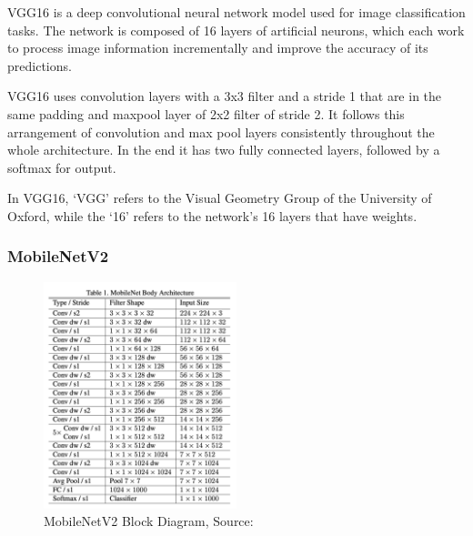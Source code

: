         VGG16 is a deep convolutional neural network model used for image classification tasks. The network is composed of 16 layers of artificial neurons, which each work to process image information incrementally and improve the accuracy of its predictions.\par \vspace{1em}

        VGG16 uses convolution layers with a 3x3 filter and a stride 1 that are in the same padding and maxpool layer of 2x2 filter of stride 2. It follows this arrangement of convolution and max pool layers consistently throughout the whole architecture. In the end it has two fully connected layers, followed by a softmax for output\cite{vgg16}.\par \vspace{1em} 

        In VGG16, ‘VGG’ refers to the Visual Geometry Group of the University of Oxford, while the ‘16’ refers to the network’s 16 layers that have weights.
        
        \subsubsection{MobileNetV2}
        
        \begin{figure}[h]
            \includegraphics[width=0.5\textwidth, center]{graphics/chapter3/mobnetV1.png}
            \caption{MobileNetV2 Block Diagram, Source: \cite{mobilenetV1}}
            \label{fig:MobileNetV2Block}
        \end{figure}

